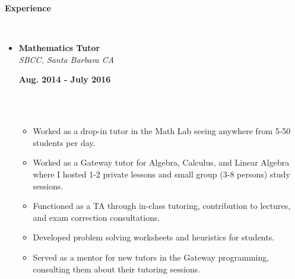 \documentclass[a4paper,11pt]{article}
\newcommand{\isep}{-2 pt}
\newcommand{\lsep}{-0.2cm}
\newcommand{\resheading}[1]{{\small \colorbox{mygrey}{\begin{minipage}{0.975\textwidth}{\textbf{#1 \vphantom{p\^{E}}}}\end{minipage}}}}
\newcommand{\workexp}[4]{
\begin{minipage}[t]{7cm}
\begin{flushleft}
\textbf{#1} \\
\indent \emph{#2}\\
\end{flushleft}
\end{minipage}
\hfill
\begin{minipage}[t]{7cm}
\begin{flushright}
\textbf{#3} \\
\indent #4 \\
\end{flushright}
\end{minipage}
}
\begin{document}



\resheading{\textbf{Experience} }\\[\lsep]
\begin{itemize}
\item 
\workexp{Mathematics Tutor}{SBCC, Santa Barbara CA}{Aug. 2014 - July 2016}{}
\\[-0.2cm]
	\begin{itemize}\itemsep \isep
	\item Worked as a drop-in tutor in the Math Lab seeing anywhere from 5-50 students per day.
	\item Worked as a Gateway tutor for Algebra, Calculus, and Linear Algebra where I hosted 1-2 private lessons and small group (3-8 persons) study sessions.
	\item Functioned as a TA through in-class tutoring, contribution to lectures, and exam correction consultations.
	\item Developed problem solving worksheets and heuristics for students.
	\item Served as a mentor for new tutors in the Gateway programming, consulting them about their tutoring sessions.
	\end{itemize}


\end{itemize}
\end{document}
